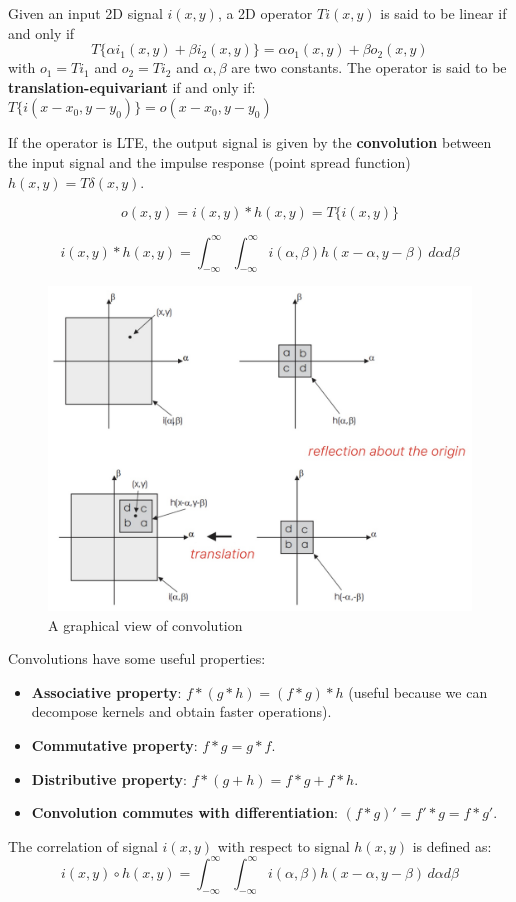 \documentclass{article}
\begin{document}
Given an input 2D signal $i(x,y)$, a 2D operator $T{i(x,y)}$ is said to be linear if and only if
$$ T\{\alpha i_1(x,y) + \beta i_2(x,y)\} = \alpha o_1(x,y) + \beta o_2(x,y) $$ with $o_1 = T{i_1}$ and $o_2 = T{i_2}$ and $\alpha, \beta$ are two constants.
The operator is said to be \textbf{translation-equivariant} if and only if: $T\{i(x-x_0, y-y_0)\} = o(x-x_0, y-y_0)$

If the operator is LTE, the output signal is given by the \textbf{convolution} between the input signal and the impulse response (point spread function) $h(x,y) = T{\delta (x,y)}$.

$$o(x,y) = i(x,y) * h(x,y) = T\{i(x,y)\}$$

$$i(x,y) * h(x,y) = \int_{-\infty}^{\infty} \int_{-\infty}^{\infty} i(\alpha, \beta) h(x-\alpha, y-\beta) \, d\alpha  d\beta $$

\begin{figure}[htbp]
  \centering
  \includegraphics[width=0.6\linewidth]{./img/graphical_convolution.jpg}
  \caption{A graphical view of convolution}
  \label{fig:graphical_convolution}
\end{figure}

Convolutions have some useful properties:
\begin{itemize}
  \item \textbf{Associative property}: $f * (g * h) = (f*g)*h$ (useful because we can decompose kernels and obtain faster operations).
  \item \textbf{Commutative property}: $f*g = g*f$.
  \item \textbf{Distributive property}: $f*(g+h) = f*g + f*h$.
  \item \textbf{Convolution commutes with differentiation}: $(f*g)' = f'*g = f*g'$.
\end{itemize}

The correlation of signal $i(x,y)$  with respect to signal $h(x,y)$ is defined as:
$$i(x,y) \circ h(x,y) = \int_{-\infty}^{\infty} \int_{-\infty}^{\infty} i(\alpha, \beta) h(x-\alpha, y-\beta) \, d\alpha  d\beta $$
\end{document}
